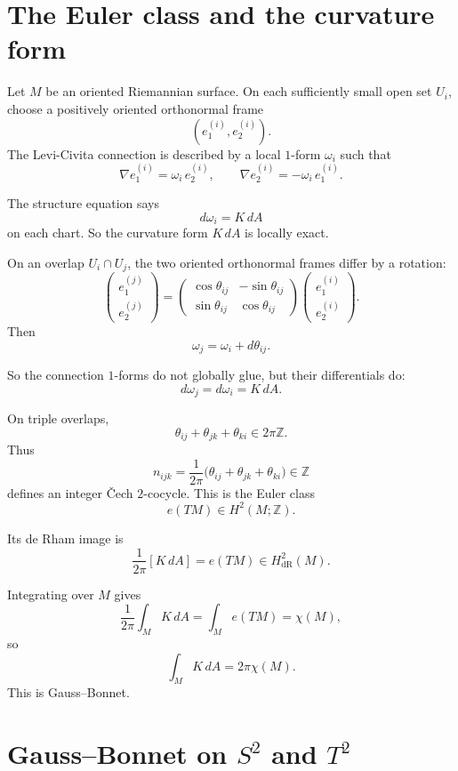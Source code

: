 \documentclass[11pt]{article}
\begin{document}
	\section{The Euler class and the curvature form}
	
	Let \(M\) be an oriented Riemannian surface. On each sufficiently small open set \(U_i\), choose a positively oriented orthonormal frame
	\[
	(e_1^{(i)},e_2^{(i)}).
	\]
	The Levi-Civita connection is described by a local \(1\)-form \(\omega_i\) such that
	\[
	\nabla e_1^{(i)}=\omega_i\,e_2^{(i)},
	\qquad
	\nabla e_2^{(i)}=-\omega_i\,e_1^{(i)}.
	\]
	
	The structure equation says
	\[
	d\omega_i=K\,dA
	\]
	on each chart. So the curvature form \(K\,dA\) is locally exact.
	
	On an overlap \(U_i\cap U_j\), the two oriented orthonormal frames differ by a rotation:
	\[
	\begin{pmatrix}
		e_1^{(j)}\\
		e_2^{(j)}
	\end{pmatrix}
	=
	\begin{pmatrix}
		\cos\theta_{ij} & -\sin\theta_{ij}\\
		\sin\theta_{ij} & \cos\theta_{ij}
	\end{pmatrix}
	\begin{pmatrix}
		e_1^{(i)}\\
		e_2^{(i)}
	\end{pmatrix}.
	\]
	Then
	\[
	\omega_j=\omega_i+d\theta_{ij}.
	\]
	
	So the connection \(1\)-forms do not globally glue, but their differentials do:
	\[
	d\omega_j=d\omega_i=K\,dA.
	\]
	
	On triple overlaps,
	\[
	\theta_{ij}+\theta_{jk}+\theta_{ki}\in 2\pi\mathbb{Z}.
	\]
	Thus
	\[
	n_{ijk}=\frac{1}{2\pi}\bigl(\theta_{ij}+\theta_{jk}+\theta_{ki}\bigr)\in \mathbb{Z}
	\]
	defines an integer \v{C}ech \(2\)-cocycle. This is the Euler class
	\[
	e(TM)\in H^2(M;\mathbb{Z}).
	\]
	
	Its de Rham image is
	\[
	\boxed{
		\frac{1}{2\pi}[K\,dA]=e(TM)\in H^2_{\mathrm{dR}}(M).
	}
	\]
	
	Integrating over \(M\) gives
	\[
	\frac{1}{2\pi}\int_M K\,dA=\int_M e(TM)=\chi(M),
	\]
	so
	\[
	\boxed{
		\int_M K\,dA=2\pi\chi(M).
	}
	\]
	This is Gauss--Bonnet.
	
	\section{Gauss--Bonnet on \(S^2\) and \(T^2\)}
	
\end{document}
